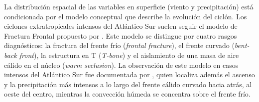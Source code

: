 %
%

La distribución espacial de las variables en superficie (viento y precipitación) está condicionada por el modelo conceptual que describe la evolución del ciclón.
Los ciclones extratropicales intensos del Atlántico Sur suelen seguir el modelo de Fractura Frontal propuesto por \citet{shapiro1990life}.
Este modelo se distingue por cuatro rasgos diagnósticos: la fractura del frente frío (\textit{frontal fracture}), el frente curvado (\textit{bent-back front}), la estructura en T (\textit{T-bone}) y el aislamiento de una masa de aire cálido en el núcleo (\textit{warm seclusion}).
La observación de este modelo en casos intensos del Atlántico Sur fue documentada por \citet{shapiro1999bridge}, quien localiza además el ascenso y la precipitación más intensos a lo largo del frente cálido curvado hacia atrás, al oeste del centro, mientras la convección húmeda se concentra sobre el frente frío.

